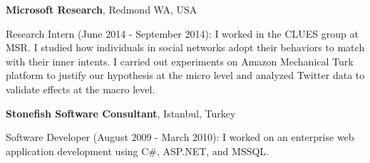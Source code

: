 \documentclass[10pt]{article}
\newenvironment{outerlist}[1][\enskip\textbullet]%
        {\begin{itemize}[#1]}{\end{itemize}%
         \vspace{-.6\baselineskip}}
\newenvironment{innerlist}[1][\enskip\textbullet]%
        {\begin{compactitem}[#1]}{\end{compactitem}}
\begin{document}
\textbf{Microsoft Research}, Redmond WA, USA
\begin{innerlist}
\item[] Research Intern (June 2014 - September 2014): I worked in the CLUES group at MSR. I studied how individuals in social networks adopt their behaviors to match with their inner intents. I carried out experiments on Amazon Mechanical Turk platform to justify our hypothesis at the micro level and analyzed Twitter data to validate effects at the macro level.
\end{innerlist}


\textbf{Stonefish Software Consultant}, Istanbul, Turkey
\begin{innerlist}
\item[] Software Developer (August 2009 - March 2010): I worked on an enterprise web application development using C\#, ASP.NET, and MSSQL. 
\end{innerlist}




\end{document}
